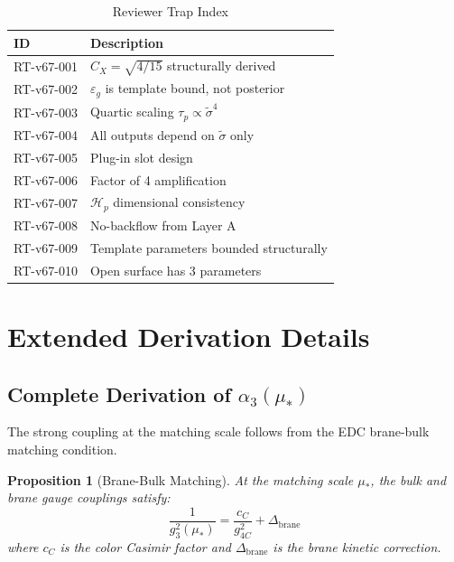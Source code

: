 \documentclass[11pt,letterpaper]{article}
\newtheorem{proposition}[theorem]{Proposition}
\newcommand{\st}{\tilde{\sigma}}
\newcommand{\eps}{\varepsilon}
\newcommand{\Hp}{\mathcal{H}_p}
\begin{document}
\begin{table}[h!]
\centering
\caption{Reviewer Trap Index}
\label{tab:reviewer-traps}
\begin{tabular}{ll}
\toprule
ID & Description \\
\midrule
RT-v67-001 & $C_X = \sqrt{4/15}$ structurally derived \\
RT-v67-002 & $\eps_g$ is template bound, not posterior \\
RT-v67-003 & Quartic scaling $\tau_p \propto \st^4$ \\
RT-v67-004 & All outputs depend on $\st$ only \\
RT-v67-005 & Plug-in slot design \\
RT-v67-006 & Factor of 4 amplification \\
RT-v67-007 & $\Hp$ dimensional consistency \\
RT-v67-008 & No-backflow from Layer A \\
RT-v67-009 & Template parameters bounded structurally \\
RT-v67-010 & Open surface has 3 parameters \\
\bottomrule
\end{tabular}
\end{table}

\section{Extended Derivation Details}
\label{app:extended}

\subsection{Complete Derivation of $\alpha_3(\mu_*)$}
\label{app:alpha3-derivation}

The strong coupling at the matching scale follows from the EDC brane-bulk matching condition.

\begin{proposition}[Brane-Bulk Matching]
\label{prop:brane-bulk}
At the matching scale $\mu_*$, the bulk and brane gauge couplings satisfy:
\begin{equation}
\frac{1}{g_3^2(\mu_*)} = \frac{c_C}{g_{4C}^2} + \Delta_{\text{brane}}
\label{eq:brane-bulk-matching}
\end{equation}
where $c_C$ is the color Casimir factor and $\Delta_{\text{brane}}$ is the brane kinetic correction.
\end{proposition}
\end{document}
